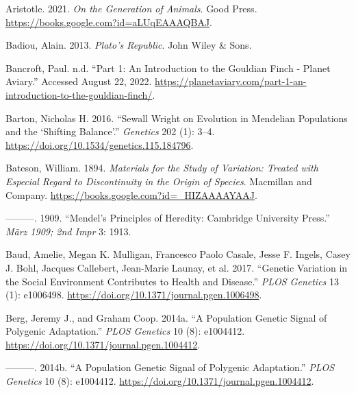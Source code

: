 \documentclass[
]{book}
\newlength{\cslhangindent}
\newlength{\cslentryspacingunit} %
\newenvironment{CSLReferences}[2] %
 {%
  \setlength{\parindent}{0pt}
  \ifodd #1
  \let\oldpar\par
  \def\par{\hangindent=\cslhangindent\oldpar}
  \fi
  \setlength{\parskip}{#2\cslentryspacingunit}
 }%
 {}
\begin{document}
\begin{CSLReferences}{1}{0}
\leavevmode{}%
Aristotle. 2021. \emph{On the {Generation} of {Animals}}. {Good Press}. \url{https://books.google.com?id=aLUqEAAAQBAJ}.

\leavevmode{}%
Badiou, Alain. 2013. \emph{Plato's {Republic}}. {John Wiley \& Sons}.

\leavevmode{}%
Bancroft, Paul. n.d. {``Part 1: {An} Introduction to the {Gouldian} Finch - {Planet Aviary}.''} Accessed August 22, 2022. \url{https://planetaviary.com/part-1-an-introduction-to-the-gouldian-finch/}.

\leavevmode{}%
Barton, Nicholas H. 2016. {``Sewall {Wright} on {Evolution} in {Mendelian Populations} and the {`{Shifting Balance}'}.''} \emph{Genetics} 202 (1): 3--4. \url{https://doi.org/10.1534/genetics.115.184796}.

\leavevmode{}%
Bateson, William. 1894. \emph{Materials for the {Study} of {Variation}: {Treated} with {Especial Regard} to {Discontinuity} in the {Origin} of {Species}}. {Macmillan and Company}. \url{https://books.google.com?id=_HIZAAAAYAAJ}.

\leavevmode{}%
---------. 1909. {``Mendel's {Principles} of {Heredity}: {Cambridge University Press}.''} \emph{März 1909; 2nd Impr} 3: 1913.

\leavevmode{}%
Baud, Amelie, Megan K. Mulligan, Francesco Paolo Casale, Jesse F. Ingels, Casey J. Bohl, Jacques Callebert, Jean-Marie Launay, et al. 2017. {``Genetic {Variation} in the {Social Environment Contributes} to {Health} and {Disease}.''} \emph{PLOS Genetics} 13 (1): e1006498. \url{https://doi.org/10.1371/journal.pgen.1006498}.

\leavevmode{}%
Berg, Jeremy J., and Graham Coop. 2014a. {``A {Population Genetic Signal} of {Polygenic Adaptation}.''} \emph{PLOS Genetics} 10 (8): e1004412. \url{https://doi.org/10.1371/journal.pgen.1004412}.

\leavevmode{}%
---------. 2014b. {``A {Population Genetic Signal} of {Polygenic Adaptation}.''} \emph{PLOS Genetics} 10 (8): e1004412. \url{https://doi.org/10.1371/journal.pgen.1004412}.


\end{CSLReferences}
\end{document}
